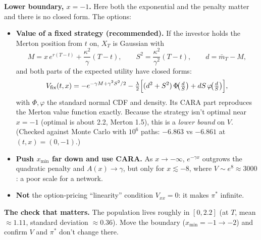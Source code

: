 \documentclass[11pt]{article}
\newcommand{\mb}{\bar m}
\begin{document}
\textbf{Lower boundary, $x=-1$.} Here both the exponential and the penalty matter and there is
no closed form. The options:
\begin{itemize}
  \item \textbf{Value of a fixed strategy (recommended).} If the investor holds the Merton
        position from $t$ on, $X_T$ is Gaussian with
        \[
          M = x\,e^{r(T-t)} + \frac{\kappa^2}{\gamma}(T-t),\qquad
          S^2 = \frac{\kappa^2}{\gamma^2}(T-t),\qquad d=\mb_T-M,
        \]
        and both parts of the expected utility have closed forms:
        \[
          V_{\text{fix}}(t,x) = -e^{-\gamma M+\gamma^2S^2/2}
          - \tfrac{\lambda}{2}\Bigl[(d^2+S^2)\,\Phi\!\bigl(\tfrac{d}{S}\bigr)
                                   + dS\,\varphi\!\bigl(\tfrac{d}{S}\bigr)\Bigr],
        \]
        with $\Phi,\varphi$ the standard normal CDF and density. Its CARA part reproduces the
        Merton value function exactly. Because the strategy isn't optimal near $x=-1$
        (optimal is about 2.2, Merton 1.5), this is a \emph{lower bound} on $V$. (Checked
        against Monte Carlo with $10^6$ paths: $-6.863$ vs $-6.861$ at $(t,x)=(0,-1)$.)
  \item \textbf{Push $x_{\min}$ far down and use CARA.} As $x\to-\infty$, $e^{-\gamma x}$
        outgrows the quadratic penalty and $A(x)\to\gamma$, but only for $x\lesssim-8$, where
        $V\sim e^{8}\approx3000$: a poor scale for a network.
  \item \textbf{Not} the option-pricing ``linearity'' condition $V_{xx}=0$: it makes
        $\pi^*$ infinite.
\end{itemize}

\textbf{The check that matters.} The population lives roughly in $[0,2.2]$ (at $T$, mean
$\approx1.11$, standard deviation $\approx0.36$). Move the boundary ($x_{\min}=-1\to-2$) and
confirm $V$ and $\pi^*$ don't change there.
\end{document}
